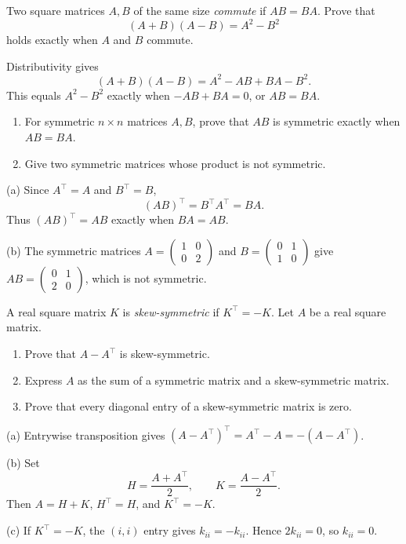 \begin{problem}\label{ex:01:difference-of-squares}
Two square matrices $A,B$ of the same size \emph{commute} if $AB=BA$.
Prove that
\[
(A+B)(A-B)=A^2-B^2
\]
holds exactly when $A$ and $B$ commute.
\end{problem}
\begin{solution}
Distributivity gives
\[
(A+B)(A-B)=A^2-AB+BA-B^2.
\]
This equals $A^2-B^2$ exactly when $-AB+BA=0$, or $AB=BA$.
\end{solution}

\begin{problem}\label{ex:01:symmetric-product}
\begin{enumerate}
\item For symmetric $n\times n$ matrices $A,B$, prove that $AB$ is
symmetric exactly when $AB=BA$.
\item Give two symmetric matrices whose product is not symmetric.
\end{enumerate}
\end{problem}
\begin{solution}
(a) Since $A^\top=A$ and $B^\top=B$,
\[
(AB)^\top=B^\top A^\top=BA.
\]
Thus $(AB)^\top=AB$ exactly when $BA=AB$.

(b) The symmetric matrices
$A=\begin{pmatrix}1&0\\0&2\end{pmatrix}$ and
$B=\begin{pmatrix}0&1\\1&0\end{pmatrix}$ give
$AB=\begin{pmatrix}0&1\\2&0\end{pmatrix}$, which is not symmetric.
\end{solution}

\begin{problem}\label{ex:01:symmetric-decomposition}
A real square matrix $K$ is \emph{skew-symmetric} if
$K^\top=-K$. Let $A$ be a real square matrix.
\begin{enumerate}
\item Prove that $A-A^\top$ is skew-symmetric.
\item Express $A$ as the sum of a symmetric matrix and a skew-symmetric
matrix.
\item Prove that every diagonal entry of a skew-symmetric matrix is zero.
\end{enumerate}
\end{problem}
\begin{solution}
(a) Entrywise transposition gives
$(A-A^\top)^\top=A^\top-A=-(A-A^\top)$.

(b) Set
\[
H=\frac{A+A^\top}2,\qquad K=\frac{A-A^\top}2.
\]
Then $A=H+K$, $H^\top=H$, and $K^\top=-K$.

(c) If $K^\top=-K$, the $(i,i)$ entry gives $k_{ii}=-k_{ii}$.
Hence $2k_{ii}=0$, so $k_{ii}=0$.
\end{solution}

